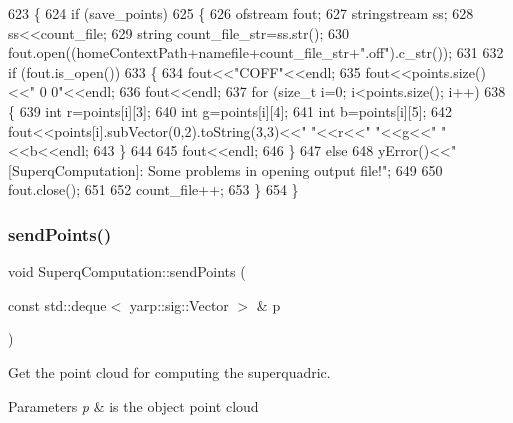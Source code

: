 \begin{DoxyCode}
623 \{
624     \textcolor{keywordflow}{if} (save_points)
625     \{
626         ofstream fout;
627         stringstream ss;
628         ss<<count\_file;
629         \textcolor{keywordtype}{string} count\_file\_str=ss.str();
630         fout.open((homeContextPath+namefile+count\_file\_str+\textcolor{stringliteral}{".off"}).c\_str());
631 
632         \textcolor{keywordflow}{if} (fout.is\_open())
633         \{
634             fout<<\textcolor{stringliteral}{"COFF"}<<endl;
635             fout<<points.size()<<\textcolor{stringliteral}{" 0 0"}<<endl;
636             fout<<endl;
637             \textcolor{keywordflow}{for} (\textcolor{keywordtype}{size\_t} i=0; i<points.size(); i++)
638             \{
639                 \textcolor{keywordtype}{int} r=points[i][3];
640                 \textcolor{keywordtype}{int} g=points[i][4];
641                 \textcolor{keywordtype}{int} b=points[i][5];
642                 fout<<points[i].subVector(0,2).toString(3,3)<<\textcolor{stringliteral}{" "}<<r<<\textcolor{stringliteral}{" "}<<g<<\textcolor{stringliteral}{" "}<<b<<endl;
643             \}
644 
645             fout<<endl;
646         \}
647         \textcolor{keywordflow}{else}
648             yError()<<\textcolor{stringliteral}{"[SuperqComputation]: Some problems in opening output file!"};
649 
650         fout.close();
651 
652         count\_file++;
653     \}
654 \}
\end{DoxyCode}
\mbox{\label{classSuperqComputation_a52c81fde3c749d05572eecd3319ac905}} 
\subsubsection{\texorpdfstring{send\+Points()}{sendPoints()}}
{\footnotesize\ttfamily void Superq\+Computation\+::send\+Points (\begin{DoxyParamCaption}\item[{const std\+::deque$<$ yarp\+::sig\+::\+Vector $>$ \&}]{p }\end{DoxyParamCaption})}



Get the point cloud for computing the superquadric. 


\begin{DoxyParams}{Parameters}
{\em p} & is the object point cloud \\
\hline
\end{DoxyParams}


